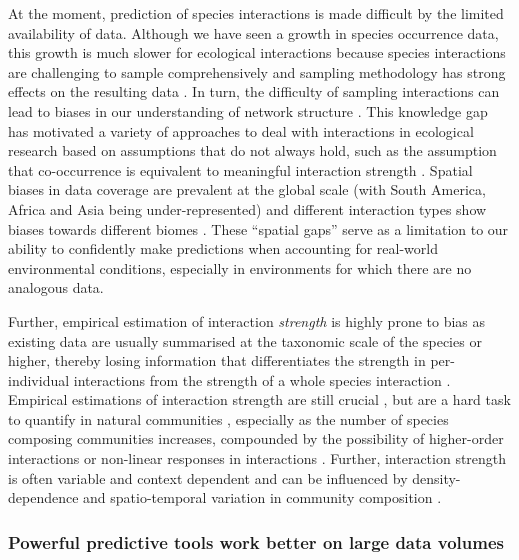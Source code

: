 At the moment, prediction of species interactions is made difficult by
the limited availability of data. Although we have seen a growth in
species occurrence data, this growth is much slower for ecological
interactions because species interactions are challenging to sample
comprehensively \cite{Bennett2019PotPit, Jordano2016SamNet} and
sampling methodology has strong effects on the resulting data
\cite{deAguiar2019RevBia}. In turn, the difficulty of sampling
interactions can lead to biases in our understanding of network
structure \cite{deAguiar2019RevBia}. This knowledge gap has motivated a
variety of approaches to deal with interactions in ecological research
based on assumptions that do not always hold, such as the assumption
that co-occurrence is equivalent to meaningful interaction strength
\cite{Blanchet2020CooNot}. Spatial biases in data coverage are prevalent
at the global scale (with South America, Africa and Asia being
under-represented) and different interaction types show biases towards
different biomes \cite{Poisot2021GloKno}. These ``spatial gaps'' serve
as a limitation to our ability to confidently make predictions when
accounting for real-world environmental conditions, especially in
environments for which there are no analogous data.

Further, empirical estimation of interaction \emph{strength} is highly
prone to bias as existing data are usually summarised at the taxonomic
scale of the species or higher, thereby losing information that
differentiates the strength in per-individual interactions from the
strength of a whole species interaction \cite{Wells2013SpeInt}.
Empirical estimations of interaction strength are still crucial
\cite{Novak2008EstNon}, but are a hard task to quantify in natural
communities \cite{Wootton1997EstTes, Sala2002ComDis,
Wootton2005MeaInt}, especially as the number of species composing
communities increases, compounded by the possibility of higher-order
interactions or non-linear responses in interactions
\cite{Wootton2005MeaInt}. Further, interaction strength is often
variable and context dependent and can be influenced by
density-dependence and spatio-temporal variation in community
composition \cite{Wootton2005MeaInt}.

\subsubsection{Powerful predictive tools work better on large data
volumes}\label{powerful-predictive-tools-work-better-on-large-data-volumes}

